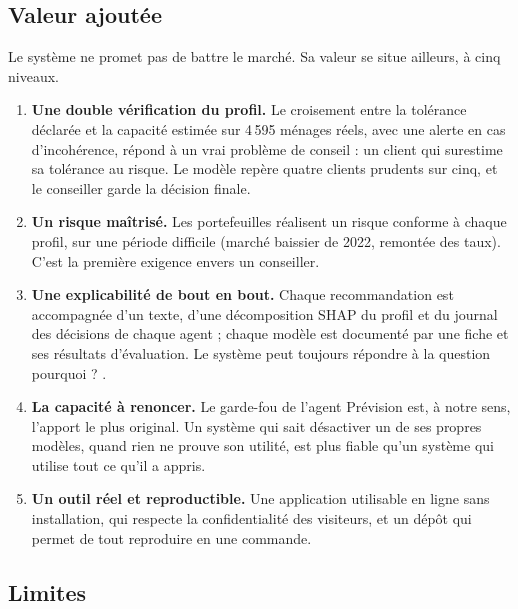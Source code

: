\subsection{Valeur ajoutée}

Le système ne promet pas de battre le marché. Sa valeur se situe ailleurs, à cinq niveaux.
\begin{enumerate}
  \item \textbf{Une double vérification du profil.} Le croisement entre la tolérance déclarée et la capacité estimée sur 4\,595 ménages réels, avec une alerte en cas d'incohérence, répond à un vrai problème de conseil : un client qui surestime sa tolérance au risque. Le modèle repère quatre clients prudents sur cinq, et le conseiller garde la décision finale.
  \item \textbf{Un risque maîtrisé.} Les portefeuilles réalisent un risque conforme à chaque profil, sur une période difficile (marché baissier de 2022, remontée des taux). C'est la première exigence envers un conseiller.
  \item \textbf{Une explicabilité de bout en bout.} Chaque recommandation est accompagnée d'un texte, d'une décomposition SHAP du profil et du journal des décisions de chaque agent ; chaque modèle est documenté par une fiche et ses résultats d'évaluation. Le système peut toujours répondre à la question \og pourquoi ? \fg{}.
  \item \textbf{La capacité à renoncer.} Le garde-fou de l'agent Prévision est, à notre sens, l'apport le plus original. Un système qui sait désactiver un de ses propres modèles, quand rien ne prouve son utilité, est plus fiable qu'un système qui utilise tout ce qu'il a appris.
  \item \textbf{Un outil réel et reproductible.} Une application utilisable en ligne sans installation, qui respecte la confidentialité des visiteurs, et un dépôt qui permet de tout reproduire en une commande.
\end{enumerate}

\subsection{Limites}

